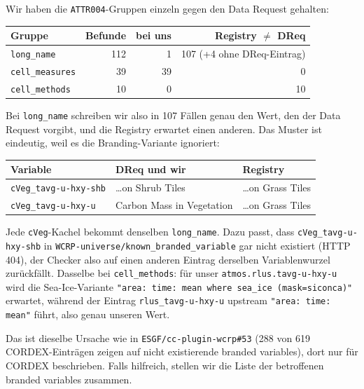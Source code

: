 \documentclass[11pt,a4paper]{article}
\newcommand{\code}[1]{\texttt{\small #1}}
\begin{document}
Wir haben die \code{ATTR004}-Gruppen einzeln gegen den Data Request gehalten:

\begin{center}
\begin{tabular}{lrrr}
\toprule
\textbf{Gruppe} & \textbf{Befunde} & \textbf{bei uns} & \textbf{Registry $\neq$ DReq} \\
\midrule
\code{long\_name}    & 112 & 1  & 107 (+4 ohne DReq-Eintrag) \\
\code{cell\_measures} & 39 & 39 & 0 \\
\code{cell\_methods}  & 10 & 0  & 10 \\
\bottomrule
\end{tabular}
\end{center}

Bei \code{long\_name} schreiben wir also in 107 F\"allen genau den Wert, den der
Data Request vorgibt, und die Registry erwartet einen anderen. Das Muster ist
eindeutig, weil es die Branding-Variante ignoriert:

\begin{center}
\begin{tabular}{lll}
\toprule
\textbf{Variable} & \textbf{DReq und wir} & \textbf{Registry} \\
\midrule
\code{cVeg\_tavg-u-hxy-shb} & \dots on Shrub Tiles & \dots on Grass Tiles \\
\code{cVeg\_tavg-u-hxy-u}   & Carbon Mass in Vegetation & \dots on Grass Tiles \\
\bottomrule
\end{tabular}
\end{center}

Jede \code{cVeg}-Kachel bekommt denselben \code{long\_name}. Dazu passt, dass
\code{cVeg\_tavg-u-hxy-shb} in \code{WCRP-universe/known\_branded\_variable} gar
nicht existiert (HTTP 404), der Checker also auf einen anderen Eintrag derselben
Variablenwurzel zur\"uckf\"allt. Dasselbe bei \code{cell\_methods}: f\"ur unser
\code{atmos.rlus.tavg-u-hxy-u} wird die Sea-Ice-Variante
\code{"area: time: mean where sea\_ice (mask=siconca)"} erwartet, w\"ahrend der
Eintrag \code{rlus\_tavg-u-hxy-u} upstream \code{"area: time: mean"} f\"uhrt, also
genau unseren Wert.

Das ist dieselbe Ursache wie in \code{ESGF/cc-plugin-wcrp\#53} (288 von 619
CORDEX-Eintr\"agen zeigen auf nicht existierende branded variables), dort nur f\"ur
CORDEX beschrieben. Falls hilfreich, stellen wir die Liste der betroffenen
branded variables zusammen.
\end{document}
